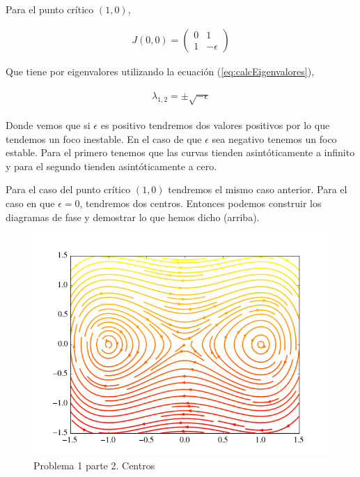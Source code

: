 \documentclass[a4paper,10pt]{article}
\begin{document}
Para el punto crítico $(1,0)$,

\begin{align}
J(0,0) = \begin{pmatrix}
     0 & 1 \\
     1 & -\epsilon
\end{pmatrix}
\label{eq:jacobiana3s}
\end{align}

Que tiene por eigenvalores utilizando la ecuación (\ref{eq:calcEigenvalores}),

\begin{align}
 \begin{split}
  \lambda_{1,2} = \pm \sqrt{-\epsilon}
 \end{split}
\end{align}

Donde vemos que si $\epsilon$ es positivo tendremos dos valores positivos por lo
que tendemos un foco inestable. En el caso de que $\epsilon$ sea negativo tenemos un
foco estable. Para el primero tenemos que las curvas tienden asintóticamente a infinito y para el segundo
tienden asintóticamente a cero. 

\vspace{.3cm}

Para el caso del punto crítico $(1,0)$ tendremos el mismo caso anterior. Para
el caso en que $\epsilon = 0$, tendremos dos centros. Entonces podemos construir 
los diagramas de fase y demostrar lo que hemos dicho (arriba).


\begin{figure}[h!]
 \centering
\includegraphics[scale=0.3]{problema1fig2}
\caption{Problema 1 parte 2. Centros}
\label{fig:problema1fig2}
\end{figure}
\end{document}
